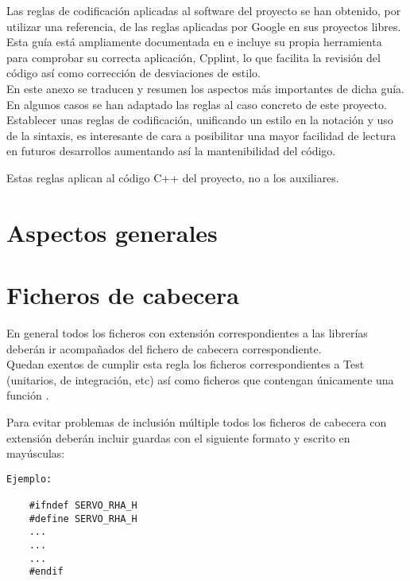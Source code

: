 Las reglas de codificación aplicadas al software del proyecto se han obtenido, por utilizar una referencia, de las reglas aplicadas por Google en sus proyectos libres. Esta guía está ampliamente documentada en \cite{googlecppguide} e incluye su propia herramienta para comprobar su correcta aplicación, Cpplint, lo que facilita la revisión del código así como corrección de desviaciones de estilo.
\\

En este anexo se traducen y resumen los aspectos más importantes de dicha guía. En algunos casos se han adaptado las reglas al caso concreto de este proyecto.
\\

Establecer unas reglas de codificación, unificando un estilo en la notación y uso de la sintaxis, es interesante de cara a posibilitar una mayor facilidad de lectura en futuros desarrollos aumentando así la mantenibilidad del código.

Estas reglas aplican al código C++ del proyecto, no a los  auxiliares.

\section{Aspectos generales} \label{sec:codificacionSW:general}

\section{Ficheros de cabecera} \label{sec:codificacionSW:cabeceras}

    En general todos los ficheros con extensión  correspondientes a las librerías deberán ir acompañados del fichero de cabecera  correspondiente.
    \\
    
    Quedan exentos de cumplir esta regla los ficheros correspondientes a Test (unitarios, de integración, etc) así como ficheros que contengan únicamente una función .


    Para evitar problemas de inclusión múltiple todos los ficheros de cabecera con extensión  deberán incluir guardas con el siguiente formato y escrito en mayúsculas:  
    \\ 
    
    \lstset{language=C, breaklines=true, basicstyle=\footnotesize}
    \begin{lstlisting}[frame=single]
Ejemplo:

    #ifndef SERVO_RHA_H
    #define SERVO_RHA_H
    ...
    ...
    ...
    #endif
    \end{lstlisting}
    
